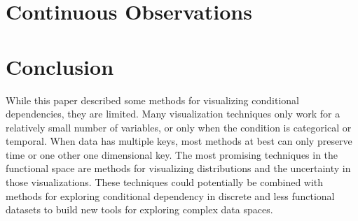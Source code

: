 \documentclass[letterpaper,onecolumn,titlepage]{Ythesis}
\begin{document}
\section{Continuous Observations}



\section{Conclusion}
\label{sec:conclusion}
While this paper described some methods for visualizing conditional dependencies, they are limited. Many visualization techniques only work for a relatively small number of variables, or only when the condition is categorical or temporal. When data has multiple keys, most methods at best can only preserve time or one other one dimensional key. The most promising techniques in the functional space are methods for visualizing distributions and the uncertainty in those visualizations. These techniques could potentially be combined with methods for exploring conditional dependency in discrete and less functional datasets to build new tools for exploring complex data spaces. 


\printbibliography
\end{document}

